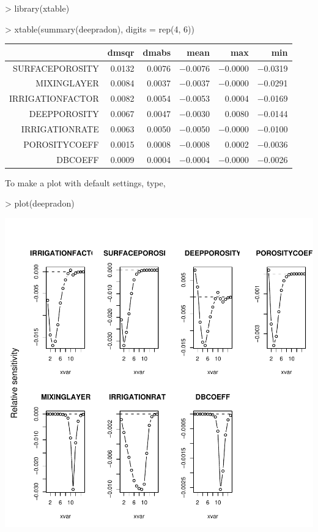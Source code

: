 \documentclass{scrartcl}
\begin{document}
\begin{Schunk}
\begin{Sinput}
> library(xtable)
\end{Sinput}
\end{Schunk}
\begin{Schunk}
\begin{Sinput}
> xtable(summary(deepradon), digits = rep(4, 6))
\end{Sinput}
\begin{table}[ht]
\begin{center}
\begin{tabular}{rrrrrr}
\hline
 & dmsqr & dmabs & mean & max & min \\
\hline
SURFACEPOROSITY & 0.0132 & 0.0076 & $-$0.0076 & $-$0.0000 & $-$0.0319 \\
MIXINGLAYER & 0.0084 & 0.0037 & $-$0.0037 & $-$0.0000 & $-$0.0291 \\
IRRIGATIONFACTOR & 0.0082 & 0.0054 & $-$0.0053 & 0.0004 & $-$0.0169 \\
DEEPPOROSITY & 0.0067 & 0.0047 & $-$0.0030 & 0.0080 & $-$0.0144 \\
IRRIGATIONRATE & 0.0063 & 0.0050 & $-$0.0050 & $-$0.0000 & $-$0.0100 \\
POROSITYCOEFF & 0.0015 & 0.0008 & $-$0.0008 & 0.0002 & $-$0.0036 \\
DBCOEFF & 0.0009 & 0.0004 & $-$0.0004 & $-$0.0000 & $-$0.0026 \\
\hline
\end{tabular}
\end{center}
\end{table}\end{Schunk}
To make a plot with default settings, type,

\begin{Schunk}
\begin{Sinput}
> plot(deepradon)
\end{Sinput}
\end{Schunk}
\includegraphics{figures/f-022}
\end{document}
